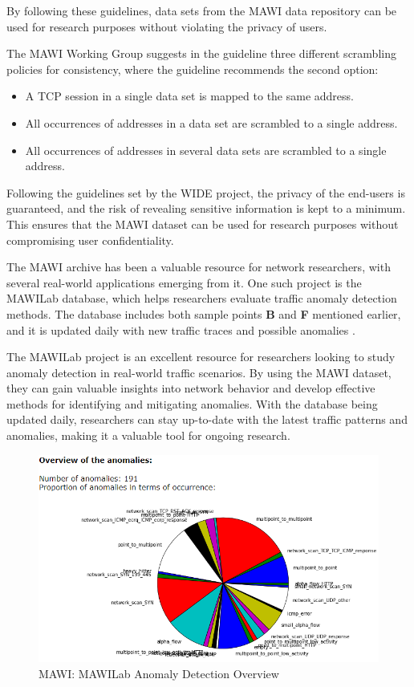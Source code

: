 \documentclass[sigconf,authorversion,nonacm]{acmart}
\begin{document}
By following these guidelines, data sets from the MAWI data repository can be used for research purposes without violating the privacy of users.

The MAWI Working Group suggests in the guideline three different scrambling policies for consistency, where the guideline recommends the second option:
\begin{itemize}
    \item A TCP session in a single data set is mapped to the same address. 
    \item All occurrences of addresses in a data set are scrambled to a single address.
    \item All occurrences of addresses in several data sets are scrambled to a single address.
\end{itemize}

Following the guidelines set by the WIDE project, the privacy of the end-users is guaranteed, and the risk of revealing sensitive information is kept to a minimum. This ensures that the MAWI dataset can be used for research purposes without compromising user confidentiality.

The MAWI archive has been a valuable resource for network researchers, with several real-world applications emerging from it. One such project is the MAWILab database, which helps researchers evaluate traffic anomaly detection methods. The database includes both sample points \textbf{B} and \textbf{F} mentioned earlier, and it is updated daily with new traffic traces and possible anomalies  \cite{mawilab}. 

The MAWILab project is an excellent resource for researchers looking to study anomaly detection in real-world traffic scenarios. By using the MAWI dataset, they can gain valuable insights into network behavior and develop effective methods for identifying and mitigating anomalies. With the database being updated daily, researchers can stay up-to-date with the latest traffic patterns and anomalies, making it a valuable tool for ongoing research.

\begin{figure}
        \includegraphics[width=\linewidth]{MAWI/MAWILab.PNG}
        \caption{MAWI: MAWILab Anomaly Detection Overview}
        \label{MAWI: MAWILab Anomaly Detection Overview}
\end{figure}
\end{document}
